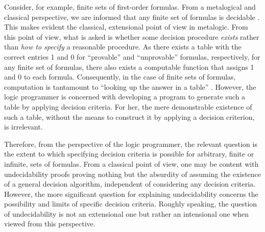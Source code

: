 \documentclass[%
  manuscript=article,   %
  year=2024,
  volume=77,
  doi=00000.000,
]{zfn}
\begin{document}
Consider, for example, finite sets of first-order formulas. From a metalogical and classical perspective, we are informed that any finite set of formulas is decidable \parencite[cf.][p.1]{DrebenGoldfarb}. \label{metafinite}
This makes evident the classical, extensional point of view in metalogic. From this point of view, what is asked is whether some decision procedure \emph{exists} rather than \emph{how to specify} a reasonable procedure. As there exists a table with the correct entries 1 and 0 for ``provable'' and ``unprovable'' formulas, respectively, for any finite set of formulas, there also exists a computable function that assigns 1 and 0 to each formula. Consequently, in the case of finite sets of formulas, computation is tantamount to  ``looking up the answer in a table'' \parencite[][p.239]{Boerger_et_al}. However, the logic programmer is concerned with developing a program to generate such a table by applying decision criteria. For her, the mere demonstrable existence of such a table, without the means to construct it by applying a decision criterion, is irrelevant.

Therefore, from the  perspective of the logic programmer,
the relevant question is the extent to which specifying decision criteria is possible for arbitrary, finite or infinite, sets of formulas. From a
classical point of view, one may be content with undecidability proofs proving nothing but the absurdity of assuming the existence of a general decision algorithm, independent of considering any decision criteria. However, the more significant question for explaining undecidability 
concerns the possibility and limits of specific decision criteria. Roughly speaking, the question of undecidability is not an extensional one but rather an intensional one when viewed from this perspective.
\end{document}
